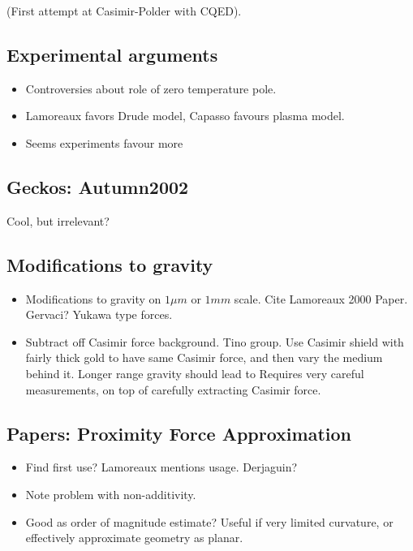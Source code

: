 \cite{Sukenik1993}

(First attempt at Casimir-Polder with CQED).

\subsection{Experimental arguments}

\begin{itemize}
\item Controversies about role of zero temperature pole.  
\item Lamoreaux favors Drude model, Capasso favours plasma model.
\item Seems experiments favour more 
\end{itemize}

\subsection{Geckos: Autumn2002}
Cool, but irrelevant?
\cite{Autumn2002}

\cite{Hawkes2014}

\subsection{Modifications to gravity}

\begin{itemize}
\item Modifications to gravity on $1\mu m$ or $1mm$ scale.  Cite Lamoreaux 2000 Paper.  Gervaci?
Yukawa type forces.  
\item Subtract off Casimir force background.  Tino group.  Use Casimir shield with fairly thick gold to have same Casimir force, and then vary the medium behind it.  Longer range gravity should lead to Requires very careful measurements, on top of carefully extracting Casimir force.   
\end{itemize}

\subsection{Papers: Proximity Force Approximation}

\begin{itemize}
\item Find first use?  Lamoreaux mentions usage.  Derjaguin?\cite{Derjaguin1956} \cite{Blocki1977}
\item Note problem with non-additivity. 
\item Good as order of magnitude estimate?  Useful if very limited curvature, or effectively approximate geometry as planar.  
\end{itemize}

